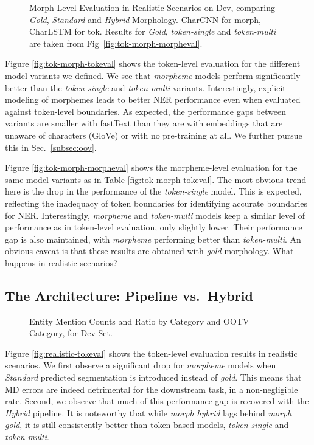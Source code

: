 \documentclass[11pt,a4paper]{article}
\newcommand{\TOKMACRO}{{\em token-single}\xspace}
\newcommand{\MULMACRO}{{\em token-multi}\xspace}
\newcommand{\MORMACRO}{{\em morpheme}\xspace}
\newcommand{\FLIPMACRO}{{\em Hybrid}\xspace}
\newcommand{\YAPMACRO}{{\em Standard}\xspace}
\begin{document}
\begin{figure}[t]
  \caption{\label{fig:realistic-morpheval} 
 Morph-Level Evaluation in  Realistic Scenarios
 on Dev, comparing \emph{Gold}, \YAPMACRO and \FLIPMACRO   Morphology. CharCNN for morph, CharLSTM for tok. Results for {\em Gold}, \TOKMACRO and \MULMACRO are taken from Fig~\ref{fig:tok-morph-morpheval}.}
\end{figure}

Figure \ref{fig:tok-morph-tokeval} shows the token-level evaluation for the different model variants we defined. We see that \MORMACRO models perform significantly better than the \TOKMACRO and \MULMACRO variants. Interestingly,  explicit modeling of morphemes leads to better NER performance even when evaluated against token-level boundaries. As expected, the performance gaps between variants are smaller with fastText  than they are with  embeddings that are unaware of characters (GloVe) or with no pre-training at all. We further pursue 
this in Sec.~\ref{subsec:oov}.   


Figure \ref{fig:tok-morph-morpheval} shows the morpheme-level evaluation for the same model variants as in Table \ref{fig:tok-morph-tokeval}. The most obvious trend here is the drop in the performance of the \TOKMACRO model. This is expected, reflecting the inadequacy of token boundaries for  identifying accurate boundaries for NER. Interestingly, \MORMACRO and \MULMACRO models keep a  similar level of performance as in token-level evaluation, only  slightly lower. Their performance gap is  also maintained,  with \MORMACRO performing better than \MULMACRO. An obvious caveat is that these results are obtained with {\em gold} morphology. What happens in realistic scenarios?

\subsection{The Architecture: Pipeline vs.\ Hybrid}
\label{sec:architectures-pipeline-hybrid}


\begin{figure}[t]
  \caption{\label{fig:analysis_ment_cat_ootv} 
  Entity Mention Counts and Ratio by Category and OOTV Category, for Dev Set.}
\end{figure}



Figure \ref{fig:realistic-tokeval} shows  the token-level evaluation results in realistic  scenarios. We first observe a significant drop for \MORMACRO models when \YAPMACRO predicted  segmentation is introduced instead of {\em gold}.   This means that MD errors are indeed detrimental for the downstream task, in a non-negligible rate. Second, we observe that much of this performance gap  is recovered with the \FLIPMACRO pipeline. 
It is noteworthy that while {\em morph hybrid} lags behind {\em morph gold}, it is still consistently better  than token-based models, \TOKMACRO and \MULMACRO.
\end{document}
